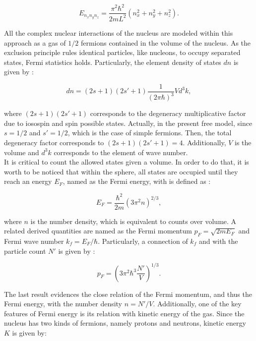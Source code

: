 \documentclass[openany]{book}
\begin{document}
\begin{equation}\label{eq:liquidDrop_FermiGas_energies}
	E_{n_xn_yn_z} = \frac{\pi^2 \hbar^2 }{2mL^2} (n^2_x + n^2_y + n^2_z).
\end{equation}

All the complex nuclear interactions of the nucleus are modeled within this approach as a gas of $1/2$ fermions contained in the volume of the nucleus. As the exclusion principle rules identical particles, like nucleons, to occupy separated states, Fermi statistics holds. Particularly, the element density of states $dn$  is given by \cite{bohr_mottelson_1998}: 


\begin{equation}\label{eq:liquidDrop_FermiGas_density}
	dn = (2s + 1)(2s' + 1) \frac{1}{(2\pi \hbar)^3} V d^3k,
\end{equation}

where $(2s + 1)(2s' +1)$ corresponds to the degeneracy multiplicative factor due to iosospin and spin possible states. Actually, in the present free model, since $s = 1/2$ and $s' = 1/2$, which is the case of simple fermions. Then, the total degeneracy factor corresponds to $(2s + 1)(2s' + 1) = 4$. Additionally, $V$ is the volume and  $ d^3k$ corresponds to the element of wave number. \\
 
It is critical to count the allowed states given a volume. In order to do that, it is worth to be noticed that within the sphere, all states are occupied until they reach an energy $E_F$, named as the Fermi energy, with is defined as \cite{basdevant_rich_spiro_2004}:

\begin{equation}\label{eq:liquidDrop_FermiGas_FermiEnergy}
	E_F = \frac{\hbar^2}{2m}(3\pi^2 n)^{2/3},
\end{equation}

where $n$ is the number density, which is equivalent to counts over volume. A related derived quantities are named as the Fermi momentum $p_F = \sqrt{2mE_F}$ and Fermi wave number $k_f = E_F/\hbar$.  Particularly, a connection of $k_f$ and with the particle count $N'$ is given by \cite{bohr_mottelson_1998}: 

\begin{equation}\label{eq:liquidDrop_FermiGas_momentum}
	p_F =  \left( 3 \pi^2 \hbar^3 \frac{N' }{V}\right)^{1/3}.
\end{equation}

The last result evidences the close relation of the Fermi momentum, and thus the Fermi energy, with the number density $n = N'/V$. Additionally, one of the key features of Fermi energy is its relation with kinetic energy of the gas. Since the nucleus has two kinds of fermions, namely protons and neutrons,  kinetic energy $K$ is given by:
\end{document}
